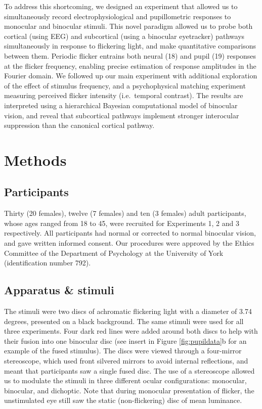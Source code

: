 \documentclass[
]{article}
\begin{document}
To address this shortcoming, we designed an experiment that allowed us to simultaneously record electrophysiological and pupillometric responses to monocular and binocular stimuli. This novel paradigm allowed us to probe both cortical (using EEG) and subcortical (using a binocular eyetracker) pathways simultaneously in response to flickering light, and make quantitative comparisons between them. Periodic flicker entrains both neural (18) and pupil (19) responses at the flicker frequency, enabling precise estimation of response amplitudes in the Fourier domain. We followed up our main experiment with additional exploration of the effect of stimulus frequency, and a psychophysical matching experiment measuring perceived flicker intensity (i.e.~temporal contrast). The results are interpreted using a hierarchical Bayesian computational model of binocular vision, and reveal that subcortical pathways implement stronger interocular suppression than the canonical cortical pathway.

\hypertarget{methods}{%
\section{Methods}\label{methods}}

\hypertarget{participants}{%
\subsection{Participants}\label{participants}}

Thirty (20 females), twelve (7 females) and ten (3 females) adult participants, whose ages ranged from 18 to 45, were recruited for Experiments 1, 2 and 3 respectively. All participants had normal or corrected to normal binocular vision, and gave written informed consent. Our procedures were approved by the Ethics Committee of the Department of Psychology at the University of York (identification number 792).

\hypertarget{apparatus-stimuli}{%
\subsection{Apparatus \& stimuli}\label{apparatus-stimuli}}

The stimuli were two discs of achromatic flickering light with a diameter of 3.74 degrees, presented on a black background. The same stimuli were used for all three experiments. Four dark red lines were added around both discs to help with their fusion into one binocular disc (see insert in Figure \ref{fig:pupildata}b for an example of the fused stimulus). The discs were viewed through a four-mirror stereoscope, which used front silvered mirrors to avoid internal reflections, and meant that participants saw a single fused disc. The use of a stereoscope allowed us to modulate the stimuli in three different ocular configurations: monocular, binocular, and dichoptic. Note that during monocular presentation of flicker, the unstimulated eye still saw the static (non-flickering) disc of mean luminance.
\end{document}
